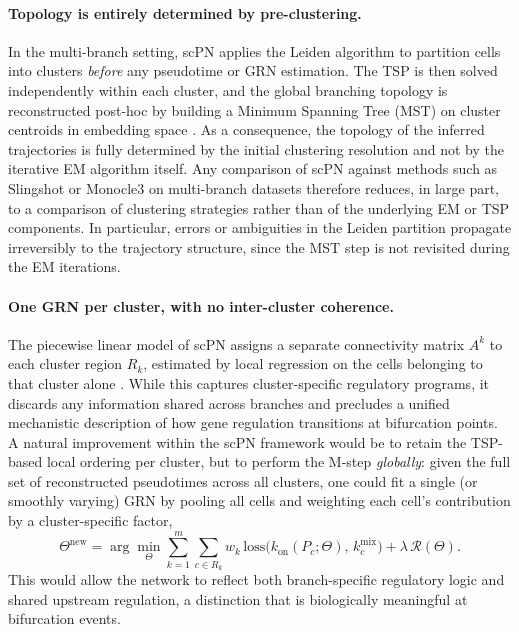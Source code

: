 \documentclass[10pt]{article}
\begin{document}
\paragraph{Topology is entirely determined by pre-clustering.}
In the multi-branch setting, scPN applies the Leiden algorithm to partition cells into
clusters \emph{before} any pseudotime or GRN estimation.  The TSP is then solved
independently within each cluster, and the global branching topology is reconstructed
post-hoc by building a Minimum Spanning Tree (MST) on cluster centroids in embedding
space \cite{Zhou2025}.  As a consequence, the topology of the inferred trajectories
is fully determined by the initial clustering resolution and not by the iterative
EM algorithm itself.  Any comparison of scPN against methods such as Slingshot or
Monocle3 on multi-branch datasets therefore reduces, in large part, to a comparison
of clustering strategies rather than of the underlying EM or TSP components.  In
particular, errors or ambiguities in the Leiden partition propagate irreversibly to
the trajectory structure, since the MST step is not revisited during the EM
iterations.

\paragraph{One GRN per cluster, with no inter-cluster coherence.}
The piecewise linear model of scPN assigns a separate connectivity matrix $A^k$ to
each cluster region $R_k$, estimated by local regression on the cells belonging to
that cluster alone \cite{Zhou2025}.  While this captures cluster-specific regulatory
programs, it discards any information shared across branches and precludes a unified
mechanistic description of how gene regulation transitions at bifurcation points.
A natural improvement within the scPN framework would be to retain the TSP-based
local ordering per cluster, but to perform the M-step \emph{globally}: given the
full set of reconstructed pseudotimes across all clusters, one could fit a single
(or smoothly varying) GRN by pooling all cells and weighting each cell's contribution
by a cluster-specific factor,
\[
    \Theta^{\mathrm{new}} = \arg\min_{\Theta}
    \sum_{k=1}^{m} \sum_{c \in R_k}
    w_k\, \mathrm{loss}\bigl(k_{\mathrm{on}}(P_c;\Theta),\, k^{\mathrm{mix}}_{c}\bigr)
    + \lambda\,\mathcal{R}(\Theta).
\]
This would allow the network to reflect both branch-specific regulatory logic and
shared upstream regulation, a distinction that is biologically meaningful at
bifurcation events.
\end{document}
